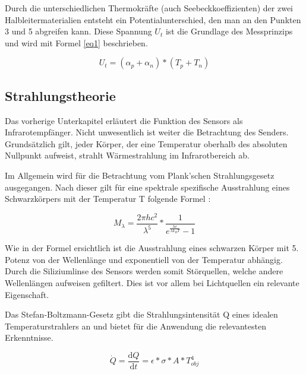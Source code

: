 Durch die unterschiedlichen Thermokräfte (auch Seebeckkoeffizienten) der zwei Halbleitermaterialien entsteht ein Potentialunterschied, den man an den Punkten 3 und 5 abgreifen kann. Diese Spannung $U_{t}$ ist die Grundlage des Messprinzips und wird mit Formel \ref{eq1} \protect\cite{AMG8834} beschrieben.


\begin{equation}
\label{eq1}
U_{t} = (\alpha_{p} + \alpha_{n})*(T_{p}+T_{n})
\end{equation}
\begin{center}

\end{center}


\subsection{Strahlungstheorie}

Das vorherige Unterkapitel erläutert die Funktion des Sensors als Infrarotempfänger. Nicht unwesentlich ist weiter die Betrachtung des Senders. Grundsätzlich gilt, jeder Körper, der eine Temperatur oberhalb des absoluten Nullpunkt aufweist, strahlt Wärmestrahlung im Infrarotbereich ab. 

Im Allgemein wird für die Betrachtung vom Plank'schen Strahlungsgesetz ausgegangen. Nach dieser gilt für eine spektrale spezifische Ausstrahlung eines Schwarzkörpers mit der Temperatur T folgende Formel \protect\cite{Thermoformeln}:

\begin{equation}
\label{eq2}
M_{\lambda } = \frac{2\pi h c^2 }{\lambda^5}*\frac{1}{e^\frac{hc}{\lambda k_{B} T}-1}
\end{equation}

Wie in der Formel ersichtlich ist die Ausstrahlung eines schwarzen Körper mit 5. Potenz von der Wellenlänge und exponentiell von der Temperatur abhängig. Durch die Siliziumlinse des Sensors werden somit Störquellen, welche andere Wellenlängen aufweisen gefiltert. Dies ist vor allem bei Lichtquellen ein relevante Eigenschaft.

Das Stefan-Boltzmann-Gesetz \protect\cite{Thermoformeln} gibt die Strahlungsintensität Q eines idealen Temperaturstrahlers an und bietet für die Anwendung die relevantesten Erkenntnisse.

\begin{equation}
\label{eq3}
\dot{Q} = \frac{\mathrm{d} Q}{\mathrm{d} t} = \epsilon *\sigma * A * T_{obj}^4
\end{equation}

